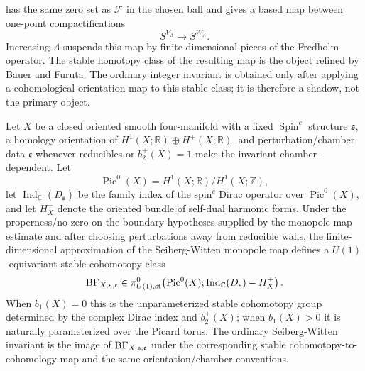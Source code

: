 has the same zero set as \(\mathcal F\) in the chosen ball and gives a based
map between one-point compactifications
\begin{equation}
  S^{V_\Lambda}\longrightarrow S^{W_\Lambda}.
  \label{eq:monopole-map-representation-spheres}
\end{equation}
Increasing \(\Lambda\) suspends this map by finite-dimensional pieces of the
Fredholm operator.  The stable homotopy class of the resulting map is the
object refined by Bauer and Furuta.  The ordinary integer invariant is obtained
only after applying a cohomological orientation map to this stable class; it is
therefore a shadow, not the primary object.

\begin{quotedtheorem}
\label{qt:bauer-furuta-refinement}
Let \(X\) be a closed oriented smooth four-manifold with a fixed
\(\operatorname{Spin}^c\) structure \(\mathfrak s\), a homology orientation
of \(H^1(X;\mathbb R)\oplus H^+(X;\mathbb R)\), and perturbation/chamber data
\(\mathfrak c\) whenever reducibles or \(b_2^+(X)=1\) make the invariant
chamber-dependent.  Let
\[
  \operatorname{Pic}^0(X)=H^1(X;\mathbb R)/H^1(X;\mathbb Z),
\]
let \(\operatorname{Ind}_{\mathbb C}(D_{\mathfrak s})\) be the family index of
the spin\(^c\) Dirac operator over \(\operatorname{Pic}^0(X)\), and let
\(H_X^+\) denote the oriented bundle of self-dual harmonic forms.  Under the
properness/no-zero-on-the-boundary hypotheses supplied by the monopole-map
estimate and after choosing perturbations away from reducible walls, the
finite-dimensional approximation of the Seiberg-Witten monopole map defines a
\(U(1)\)-equivariant stable cohomotopy class
\begin{equation}
  {\rm BF}_{X,\mathfrak s,\mathfrak c}
  \in
  \pi^0_{U(1),{\rm st}}
  \!\left(
    \operatorname{Pic}^0(X);
    \operatorname{Ind}_{\mathbb C}(D_{\mathfrak s})-H_X^+
  \right).
  \label{eq:bauer-furuta-class}
\end{equation}
When \(b_1(X)=0\) this is the unparameterized stable cohomotopy group
determined by the complex Dirac index and \(b_2^+(X)\); when \(b_1(X)>0\) it
is naturally parameterized over the Picard torus.  The ordinary
Seiberg-Witten invariant is the image of
\({\rm BF}_{X,\mathfrak s,\mathfrak c}\) under the corresponding stable
cohomotopy-to-cohomology map and the same orientation/chamber conventions.
\end{quotedtheorem}

